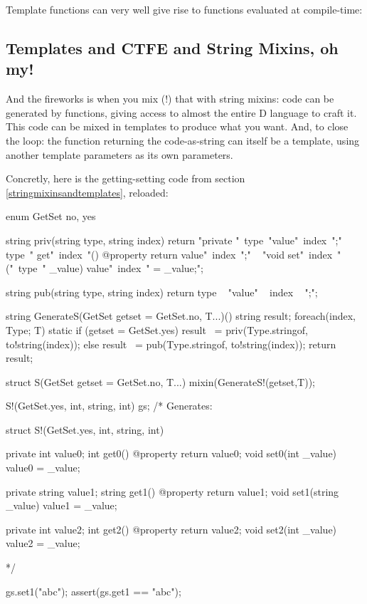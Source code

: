 Template functions can very well give rise to functions evaluated at compile-time:

\begin{dcode}
\end{dcode}

\subsection{Templates and CTFE and String Mixins, oh my!}
\label{templatesandctfeandstringmixins}

And the fireworks is when you mix (!) that with string mixins: code can be generated by functions, giving access to almost the entire D language to craft it. This code can be mixed in templates to produce what you want. And, to close the loop: the function returning the code-as-string can itself be a template, using another template parameters as its own parameters.

Concretly, here is the getting-setting code from section \ref{stringmixinsandtemplates}, reloaded:

\begin{dcode}
enum GetSet { no, yes}

string priv(string type, string index)
{
    return 
    "private "~type~"value"~index~";\n"
  ~ type~" get"~index~"() @property { return value"~index~";}\n"
  ~ "void set"~index~"("~type~" _value) { value"~index~" = _value;}";
}   

string pub(string type, string index)
{
    return type ~ "value" ~ index ~ ";";
}

string GenerateS(GetSet getset = GetSet.no, T...)()
{
    string result;    
    foreach(index, Type; T)
        static if (getset = GetSet.yes)
		     result ~= priv(Type.stringof, to!string(index));
        else
            result ~= pub(Type.stringof, to!string(index));
    return result;
}

struct S(GetSet getset = GetSet.no, T...)
{
    mixin(GenerateS!(getset,T));
}

S!(GetSet.yes, int, string, int) gs;
/* Generates:

struct S!(GetSet.yes, int, string, int)
{
    private int value0;
    int get0() @property { return value0;}
    void set0(int _value) { value0 = _value;}

    private string value1;
    string get1() @property { return value1;}
    void set1(string _value) { value1 = _value;}

    private int value2;
    int get2() @property { return value2;}
    void set2(int _value) { value2 = _value;}
}
*/

gs.set1("abc");
assert(gs.get1 == "abc");
\end{dcode}

